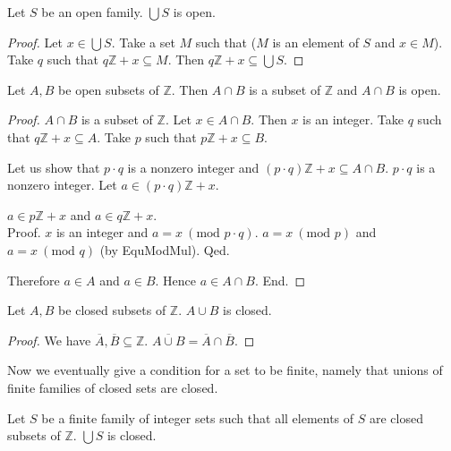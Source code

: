 \documentclass{article}
\renewcommand{\mod}{\text{mod }}
\newcommand{\Int}{\mathbb{Z}}
\begin{document}
  \begin{forthel}
    \begin{lemma}[UnionOpen]
      Let $S$ be an open family. $\bigcup S$ is open.
    \end{lemma}
    \begin{proof}
      Let $x \in \bigcup S$. Take a set $M$ such that ($M$ is an element of $S$ and $x \in M$). Take $q$ such that $q \Int + x \subseteq M$. Then $q \Int + x \subseteq \bigcup S$.
    \end{proof}

    \begin{lemma}[InterOpen]
      Let $A,B$ be open subsets of $\Int$. Then $A \cap B$ is a subset of $\Int$ and $A \cap B$ is open.
    \end{lemma}
    \begin{proof}
      $A \cap B$ is a subset of $\Int$. Let $x \in A \cap B$. Then $x$ is an integer. Take $q$ such that $q \Int + x \subseteq A$. Take $p$ such that $p \Int + x \subseteq B$.

      Let us show that $p \cdot q$ is a nonzero integer and $(p \cdot q) \Int + x \subseteq A \cap B$.
        $p \cdot q$ is a nonzero integer. Let $a \in (p \cdot q) \Int + x$.

        $a \in p \Int + x$ and $a \in q \Int + x$. \\
        Proof.
          $x$ is an integer and $a = x ~(\mod p \cdot q)$. $a = x ~(\mod p)$ and $a = x ~(\mod q)$ (by EquModMul).
        Qed.

        Therefore $a \in A$ and $a \in B$. Hence $a \in A \cap B$.
      End.
    \end{proof}

    \begin{lemma}[UnionClosed]
      Let $A,B$ be closed subsets of $\Int$. $A \cup B$ is closed.
    \end{lemma}
    \begin{proof}
      We have $\overline{A}, \overline{B} \subseteq \Int$. $\overline{A \cup B} = \overline{A} \cap \overline{B}$.
    \end{proof}
  \end{forthel}

  Now we eventually give a condition for a set to be finite, namely that unions of finite families of closed sets are closed.

  \begin{forthel}
    \begin{axiom}[UnionSClosed]
      Let $S$ be a finite family of integer sets such that all elements of $S$ are closed subsets of $\Int$. $\bigcup S$ is closed.
    \end{axiom}
  \end{forthel}
\end{document}
